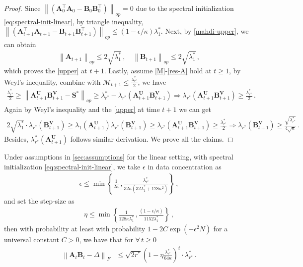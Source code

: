 \begin{proof}
    Since $\left\|\left(\bm A_{0}^{\!\top}\bm A_{0} - \bm B_{0}\bm B_{0}^{\!\top}\right)\right\|_{op}=0$ due to the spectral initialization \eqref{eq:spectral-init-linear}, by triangle inequality, $\left\|\left(\bm A_{t+1}^{\!\top}\bm A_{t+1} - \bm B_{t+1}\bm B_{t+1}^{\!\top}\right)\right\|_{op}\leq (1-\epsilon/\kappa)\lambda_1^*$. Next, by \cref{mahdi-upper}, we can obtain
    \begin{align*}
        \left\|\bm A_{t+1}\right\|_{op}\leq 2\sqrt{\lambda_1^*}\,,\quad\left\|\bm B_{t+1}\right\|_{op}\leq 2\sqrt{\lambda_1^*}\,,
    \end{align*}
    which proves the \cref{upper} at $t+1$. Lastly, assume \cref{M}-\cref{res-A} hold at $t\geq 1$, by Weyl's inequality, combine with $\mathcal{M}_{t+1}\leq \frac{\lambda_{r^*}^*}{2}$, we have
    \begin{align*}
        \frac{\lambda_{r^*}^*}{2} \geq \left\|\bm A_{t+1}^{\bm U} \bm B_{t+1}^{\bm V} - \bm S^*\right\|_{op} \geq \lambda_{r^*}^* - \lambda_{r^*}(\bm A_{t+1}^{\bm U} \bm B_{t+1}^{\bm V})\Rightarrow \lambda_{r^*}(\bm A_{t+1}^{\bm U} \bm B_{t+1}^{\bm V})\geq \frac{\lambda_{r^*}^*}{2}\,.
    \end{align*}
    Again by Weyl's inequality and the \cref{upper} at time $t+1$ we can get
    \begin{align*}
        2 \sqrt{\lambda_1^*}\cdot\lambda_{r^*}(\bm B_{t+1}^{\bm V})\geq \lambda_1(\bm A_{t+1}^{\bm U})\lambda_{r^*}(\bm B_{t+1}^{\bm V})\geq\lambda_{r^*}(\bm A_{t+1}^{\bm U} \bm B_{t+1}^{\bm V})\geq \frac{\lambda_{r^*}^*}{2}\Rightarrow \lambda_{r^*}(\bm B_{t+1}^{\bm V}) \geq \frac{\sqrt{\lambda_{r^*}^*}}{4 \sqrt{\kappa}}\,.
    \end{align*}
    Besides, $\lambda_{r^*}^*(\bm A_{t+1}^{\bm U})$ follows similar derivation. We prove all the claims.
\end{proof}
\begin{theorem}
\label{risk-conv-linear-vanilla-gd}
    Under assumptions in \cref{sec:assumptions} for the linear setting, with spectral initialization \eqref{eq:spectral-init-linear}, we take $\epsilon$ in data concentration as
    \begin{align*}
        \epsilon \leq \min\left\{\frac{1}{2\kappa}\,,\frac{\lambda^*_{r^*}}{32\kappa(32 \lambda_1^*+128 \kappa^2)}\right\}\,,
    \end{align*}
    and set the step-size as
    \begin{align}\label{lr-linear-gd}
        \eta \leq \min\left\{\frac{1}{128\kappa\lambda_1^*}\,,\frac{(1-\epsilon/\kappa)}{1152\lambda^*_{1}}\right\}\,,
    \end{align}
    then with probability at least with probability $1- 2C\exp(-\epsilon^2 N)$ for a universal constant $C>0$, we have that for $\forall\,t\geq 0$
    \begin{align*}
    \left\|\bm A_t \bm B_t - \Delta\right\|_F
    & \leq \sqrt{2 r^*} \left(1 - \eta \frac{\lambda_{r^*}^*}{64 \kappa}\right)^{t}\cdot\lambda_{r^*}^*\,.
\end{align*}
\end{theorem}
